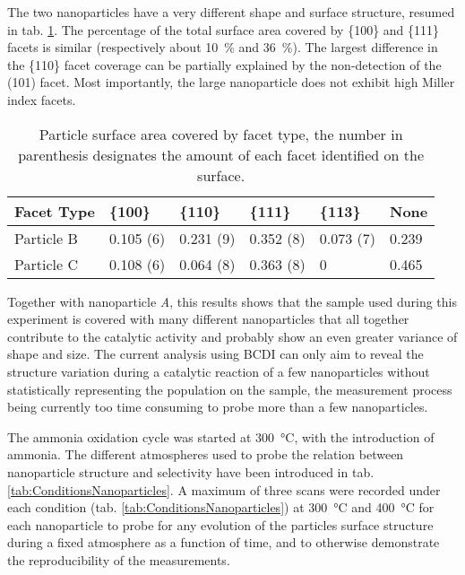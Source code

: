 The two nanoparticles have a very different shape and surface structure, resumed in tab. \ref{tab:FacetCoverage}.
The percentage of the total surface area covered by \{100\} and \{111\} facets is similar (respectively about \qty{10}{\percent} and \qty{36}{\percent}).
The largest difference in the \{110\} facet coverage can be partially explained by the non-detection of the (101) facet.
Most importantly, the large nanoparticle does not exhibit high Miller index facets.

\begin{table}[!htb]
    \centering
    \begin{tabular}{@{}llllll@{}}
    \toprule
    Facet Type & \{100\} & \{110\} & \{111\} & \{113\} & None \\ \midrule
    Particle B & 0.105 (6) & 0.231 (9) & 0.352 (8) & 0.073 (7) & 0.239 \\ \bottomrule
    Particle C & 0.108 (6) & 0.064 (8) & 0.363 (8) & 0 & 0.465 \\
    \end{tabular}%
    \caption{
        Particle surface area covered by facet type, the number in parenthesis designates the amount of each facet identified on the surface.
    }
    \label{tab:FacetCoverage}
\end{table}

Together with nanoparticle \textit{A}, this results shows that the sample used during this experiment is covered with many different nanoparticles that all together contribute to the catalytic activity and probably show an even greater variance of shape and size.
The current analysis using BCDI can only aim to reveal the structure variation during a catalytic reaction of a few nanoparticles without statistically representing the population on the sample, the measurement process being currently too time consuming to probe more than a few nanoparticles.

The ammonia oxidation cycle was started at \qty{300}{\degreeCelsius}, with the introduction of ammonia.
The different atmospheres used to probe the relation between nanoparticle structure and selectivity have been introduced in tab. \ref{tab:ConditionsNanoparticles}.
A maximum of three scans were recorded under each condition (tab. \ref{tab:ConditionsNanoparticles}) at \qty{300}{\degreeCelsius} and \qty{400}{\degreeCelsius} for each nanoparticle to probe for any evolution of the particles surface structure during a fixed atmosphere as a function of time, and to otherwise demonstrate the reproducibility of the measurements.

